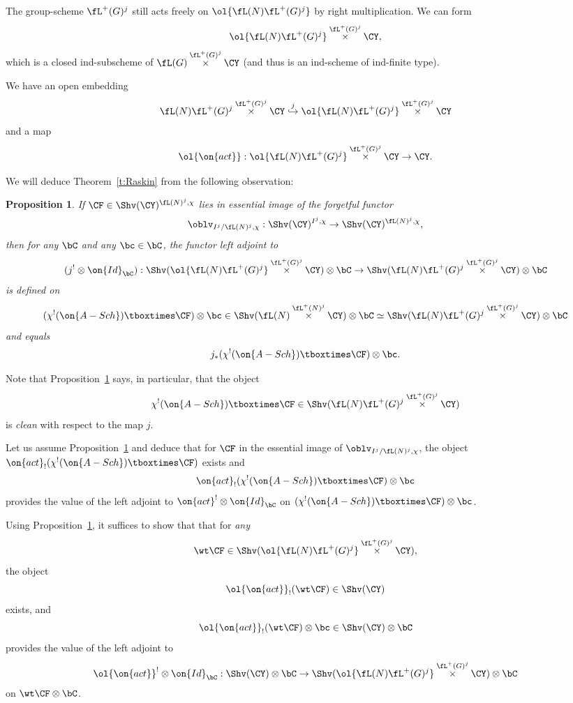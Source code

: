 \documentclass[9pt]{amsart}
\newtheorem{prop}[subsubsection]{Proposition}
\theoremstyle{definition}
\theoremstyle{remark}
\newcommand{\thmref}[1]{Theorem~\ref{#1}}
\newcommand{\propref}[1]{Proposition~\ref{#1}}
\numberwithin{equation}{section}
\begin{document}
\medskip

The group-scheme $\fL^+(G)^j$ still
acts freely on $\ol{\fL(N)\fL^+(G)^j}$ by right multiplication. We can form
$$\ol{\fL(N)\fL^+(G)^j} \overset{\fL^+(G)^j}\times \CY,$$
which is a closed ind-subscheme of $\fL(G)\overset{\fL^+(G)^j}\times \CY$
(and thus is an ind-scheme of ind-finite type). 

\medskip

We have an open embedding
$$\fL(N)\fL^+(G)^j \overset{\fL^+(G)^j}\times \CY \overset{j}\hookrightarrow 
\ol{\fL(N)\fL^+(G)^j} \overset{\fL^+(G)^j}\times \CY$$
and a map
$$\ol{\on{act}}:\ol{\fL(N)\fL^+(G)^j} \overset{\fL^+(G)^j}\times \CY\to \CY.$$

\sssec{}

We will deduce \thmref{t:Raskin} from the following observation:

\begin{prop}  \label{p:clean}
If $\CF\in \Shv(\CY)^{\fL(N)^j,\chi}$ lies in essential image of the forgetful functor
$$\oblv_{I^j/\fL(N)^j,\chi}:\Shv(\CY)^{I^j,\chi}\to \Shv(\CY)^{\fL(N)^j,\chi},$$
then for any $\bC$ and any $\bc\in \bC$, the functor left adjoint to 
$$(j^!\otimes \on{Id}_\bC):\Shv(\ol{\fL(N)\fL^+(G)^j} \overset{\fL^+(G)^j}\times \CY)\otimes \bC\to
\Shv(\fL(N)\fL^+(G)^j \overset{\fL^+(G)^j}\times \CY)\otimes \bC$$
is defined on 
$$(\chi^!(\on{A-Sch})\tboxtimes \CF)\otimes \bc\in \Shv(\fL(N) \overset{\fL^+(N)^j}\times \CY)\otimes \bC\simeq 
\Shv(\fL(N)\fL^+(G)^j \overset{\fL^+(G)^j}\times \CY)\otimes \bC$$
and equals 
$$j_*(\chi^!(\on{A-Sch})\tboxtimes \CF)\otimes \bc.$$
\end{prop}

Note that \propref{p:clean} says, in particular, that the object 
$$\chi^!(\on{A-Sch})\tboxtimes \CF\in \Shv(\fL(N)\fL^+(G)^j \overset{\fL^+(G)^j}\times \CY)$$
is \emph{clean} with respect to the map $j$. 

\sssec{}

Let us assume \propref{p:clean} and deduce that for $\CF$ in the essential image of $\oblv_{I^j/\fL(N)^j,\chi}$, the object 
$\on{act}_!(\chi^!(\on{A-Sch})\tboxtimes \CF)$ exists and 
$$\on{act}_!(\chi^!(\on{A-Sch})\tboxtimes \CF)\otimes \bc$$
provides the value of the left adjoint to $\on{act}^!\otimes \on{Id}_\bC$ on $(\chi^!(\on{A-Sch})\tboxtimes \CF)\otimes \bc$. 

\medskip

Using \propref{p:clean}, it suffices to show that that for \emph{any}
$$\wt\CF\in \Shv(\ol{\fL(N)\fL^+(G)^j} \overset{\fL^+(G)^j}\times \CY),$$
the object 
$$\ol{\on{act}}_!(\wt\CF)\in \Shv(\CY)$$ exists, and 
$$\ol{\on{act}}_!(\wt\CF)\otimes \bc\in \Shv(\CY)\otimes \bC$$ 
provides the value of the left adjoint to 
$$\ol{\on{act}}^!\otimes \on{Id}_\bC:\Shv(\CY)\otimes \bC\to \Shv(\ol{\fL(N)\fL^+(G)^j} \overset{\fL^+(G)^j}\times \CY)\otimes \bC$$
on $\wt\CF\otimes \bC$.
\end{document}
